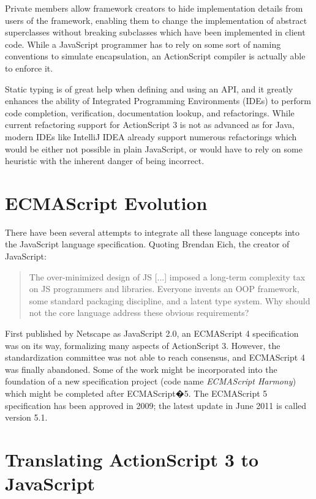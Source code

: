 \documentclass[10pt]{sigplanconf}
\begin{document}
Private members allow framework creators to hide implementation details from users of the framework, enabling them to change the implementation of abstract superclasses without breaking subclasses which have been implemented in client code. While a JavaScript programmer has to rely on some sort of naming conventions to simulate encapsulation, an ActionScript compiler is actually able to enforce it.

Static typing is of great help when defining and using an API, and it greatly enhances the ability of Integrated Programming Environments (IDEs) to perform code completion, verification, documentation lookup, and refactorings. While current refactoring support for ActionScript 3 is not as advanced as for Java, modern IDEs like IntelliJ IDEA\citep{idea} already support numerous refactorings which would be either not possible in plain JavaScript, or would have to rely on some heuristic with the inherent danger of being incorrect.

\section{ECMAScript Evolution}

There have been several attempts to integrate all these language concepts into the JavaScript language specification. Quoting Brendan Eich, the creator of Java\-Script:

\begin{quotation}
The over-minimized design of JS [...] imposed a long-term complexity tax on JS programmers and libraries. Everyone invents an OOP framework, some standard packaging discipline, and a latent type system. Why should not the core language address these obvious requirements?\citep{Eich2007-comment-open-letter}
\end{quotation}

First published by Netscape as JavaScript 2.0, an ECMAScript 4 specification\citep{ecmascript4} was on its way, formalizing many aspects of ActionScript 3. However, the standardization committee was not able to reach consensus, and ECMAScript 4 was finally abandoned. Some of the work might be incorporated into the foundation of a new specification project (code name \emph{ECMAScript Harmony}\citep{Eich2008-es-discuss}) which might be completed after ECMAScript�5.  The ECMAScript 5 spec\-i\-fi\-ca\-tion\citep{ecma262-5.1} has been approved in 2009; the latest update in June 2011 is called version 5.1.

\section{Translating ActionScript 3 to JavaScript}
\end{document}
